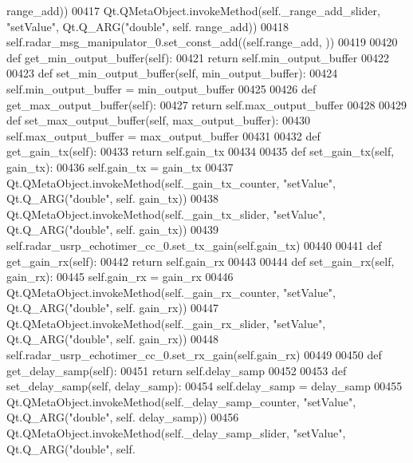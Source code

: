 \begin{DoxyCode}
      range_add))
00417         Qt.QMetaObject.invokeMethod(self._range_add_slider, \textcolor{stringliteral}{"setValue"}, Qt.Q\_ARG(\textcolor{stringliteral}{"double"}, self.
      range_add))
00418         self.radar\_msg\_manipulator\_0.set\_const\_add((self.range_add, ))
00419 
00420     \textcolor{keyword}{def }get_min_output_buffer(self):
00421         \textcolor{keywordflow}{return} self.min_output_buffer
00422 
00423     \textcolor{keyword}{def }set_min_output_buffer(self, min\_output\_buffer):
00424         self.min_output_buffer = min\_output\_buffer
00425 
00426     \textcolor{keyword}{def }get_max_output_buffer(self):
00427         \textcolor{keywordflow}{return} self.max_output_buffer
00428 
00429     \textcolor{keyword}{def }set_max_output_buffer(self, max\_output\_buffer):
00430         self.max_output_buffer = max\_output\_buffer
00431 
00432     \textcolor{keyword}{def }get_gain_tx(self):
00433         \textcolor{keywordflow}{return} self.gain_tx
00434 
00435     \textcolor{keyword}{def }set_gain_tx(self, gain\_tx):
00436         self.gain_tx = gain\_tx
00437         Qt.QMetaObject.invokeMethod(self._gain_tx_counter, \textcolor{stringliteral}{"setValue"}, Qt.Q\_ARG(\textcolor{stringliteral}{"double"}, self.
      gain_tx))
00438         Qt.QMetaObject.invokeMethod(self._gain_tx_slider, \textcolor{stringliteral}{"setValue"}, Qt.Q\_ARG(\textcolor{stringliteral}{"double"}, self.
      gain_tx))
00439         self.radar\_usrp\_echotimer\_cc\_0.set\_tx\_gain(self.gain_tx)
00440 
00441     \textcolor{keyword}{def }get_gain_rx(self):
00442         \textcolor{keywordflow}{return} self.gain_rx
00443 
00444     \textcolor{keyword}{def }set_gain_rx(self, gain\_rx):
00445         self.gain_rx = gain\_rx
00446         Qt.QMetaObject.invokeMethod(self._gain_rx_counter, \textcolor{stringliteral}{"setValue"}, Qt.Q\_ARG(\textcolor{stringliteral}{"double"}, self.
      gain_rx))
00447         Qt.QMetaObject.invokeMethod(self._gain_rx_slider, \textcolor{stringliteral}{"setValue"}, Qt.Q\_ARG(\textcolor{stringliteral}{"double"}, self.
      gain_rx))
00448         self.radar\_usrp\_echotimer\_cc\_0.set\_rx\_gain(self.gain_rx)
00449 
00450     \textcolor{keyword}{def }get_delay_samp(self):
00451         \textcolor{keywordflow}{return} self.delay_samp
00452 
00453     \textcolor{keyword}{def }set_delay_samp(self, delay\_samp):
00454         self.delay_samp = delay\_samp
00455         Qt.QMetaObject.invokeMethod(self._delay_samp_counter, \textcolor{stringliteral}{"setValue"}, Qt.Q\_ARG(\textcolor{stringliteral}{"double"}, self.
      delay_samp))
00456         Qt.QMetaObject.invokeMethod(self._delay_samp_slider, \textcolor{stringliteral}{"setValue"}, Qt.Q\_ARG(\textcolor{stringliteral}{"double"}, self.

\end{DoxyCode}
